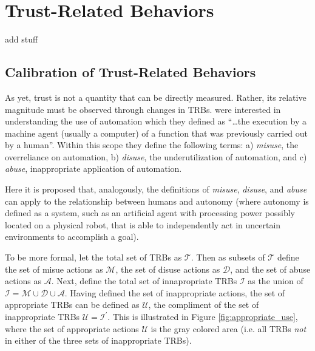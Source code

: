 \section{Trust-Related Behaviors}
add stuff
\subsection{Calibration of Trust-Related Behaviors}
    As yet, trust is not a quantity that can be directly measured. Rather, its relative magnitude must be observed through changes in TRBs. \citet{Parasuraman1997-co} were interested in understanding the use of automation which they defined as ``\ldots the execution by a machine agent (usually a computer) of a function that was previously carried out by a human''. Within this scope they define the following terms: a) \emph{misuse}, the overreliance on automation, b) \emph{disuse}, the underutilization of automation, and c) \emph{abuse}, inappropriate application of automation.

    Here it is proposed that, analogously, the definitions of \emph{misuse}, \emph{disuse}, and \emph{abuse} can apply to the relationship between humans and autonomy (where autonomy is defined as a system, such as an artificial agent with processing power possibly located on a physical robot, that is able to independently act in uncertain environments to accomplish a goal).
    
    To be more formal, let the total set of TRBs as $\mathcal{T}$. Then as subsets of $\mathcal{T}$ define the set of misue actions as $\mathcal{M}$, the set of disuse actions as $\mathcal{D}$, and the set of abuse actions as $\mathcal{A}$. Next, define the total set of innapropriate TRBs $\mathcal{I}$ as the union of $\mathcal{I} = \mathcal{M}\cup \mathcal{D}\cup\mathcal{A}$. Having defined the set of inappropriate actions, the set of appropriate TRBs can be defined as $\mathcal{U}$, the compliment of the set of inappropriate TRBs $\mathcal{U} = \mathcal{I}^\prime$. This is illustrated in Figure \ref{fig:appropriate_use}, where the set of appropriate actions $\mathcal{U}$ is the gray colored area (i.e. all TRBs \emph{not} in either of the three sets of inappropriate TRBs).
    

